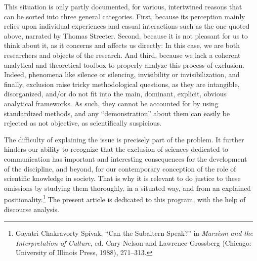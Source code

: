 \documentclass{tufte-handout}
\begin{document}
This situation is only partly documented, for various, intertwined
reasons that can be sorted into three general categories. First, because
its perception mainly relies upon individual experiences and casual
interactions such as the one quoted above, narrated by Thomas Streeter.
Second, because it is not pleasant for us to think about it, as it
concerns and affects us directly: In this case, we are both researchers
and objects of the research. And third, because we lack a coherent
analytical and theoretical toolbox to properly analyze this process of
exclusion. Indeed, phenomena like silence or silencing, invisibility or
invisibilization, and finally, exclusion raise tricky methodological
questions, as they are intangible, disorganized, and/or do not fit into
the main, dominant, explicit, obvious analytical frameworks. As such,
they cannot be accounted for by using standardized methods, and any
``demonstration'' about them can easily be rejected as not objective, as
scientifically suspicious.

The difficulty of explaining the issue is precisely part of the problem.
It further hinders our ability to recognize that the exclusion of
sciences dedicated to communication has important and interesting
consequences for the development of the discipline, and beyond, for our
contemporary conception of the role of scientific knowledge in society.
That is why it is relevant to do justice to these omissions by studying
them thoroughly, in a situated way, and from an explained
positionality.\footnote{Gayatri Chakravorty Spivak, ``Can the Subaltern
  Speak?'' in \emph{Marxism and the Interpretation of Culture}, ed. Cary
  Nelson and Lawrence Grossberg (Chicago: University of Illinois Press,
  1988), 271--313.} The present article is dedicated to this program,
with the help of discourse analysis.
\end{document}
